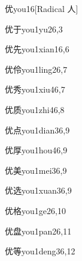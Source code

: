 \begin{verbete}{优}{you1}{6}[Radical 人]
\end{verbete}

\begin{verbete}{优于}{you1yu2}{6,3}
\end{verbete}

\begin{verbete}{优先}{you1xian1}{6,6}
\end{verbete}

\begin{verbete}{优伶}{you1ling2}{6,7}
\end{verbete}

\begin{verbete}{优秀}{you1xiu4}{6,7}
\end{verbete}

\begin{verbete}{优质}{you1zhi4}{6,8}
\end{verbete}

\begin{verbete}{优点}{you1dian3}{6,9}
\end{verbete}

\begin{verbete}{优厚}{you1hou4}{6,9}
\end{verbete}

\begin{verbete}{优美}{you1mei3}{6,9}
\end{verbete}

\begin{verbete}{优选}{you1xuan3}{6,9}
\end{verbete}

\begin{verbete}{优格}{you1ge2}{6,10}
\end{verbete}

\begin{verbete}{优盘}{you1pan2}{6,11}
\end{verbete}

\begin{verbete}{优等}{you1deng3}{6,12}
\end{verbete}

